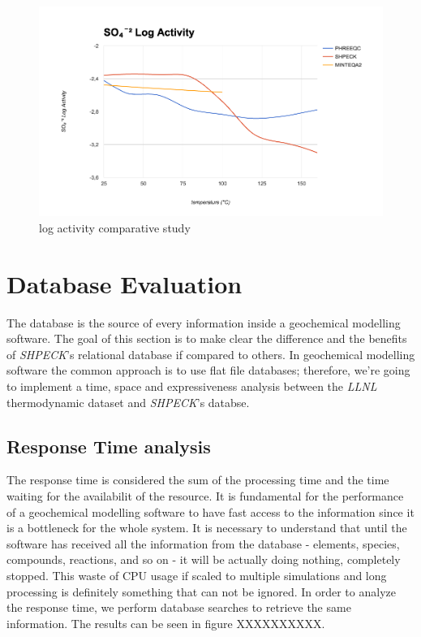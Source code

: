 \begin{figure}[ht!]
\centering
\includegraphics[width=140mm]{figures/so4-2.png}
\caption{ log activity comparative study}
\label{fig:so4-2}
\end{figure}


\newpage
\section{Database Evaluation}
The database is the source of every information inside a geochemical modelling software. The goal of this section is to make clear the difference and the benefits of \emph{SHPECK}'s relational database if compared to others. In geochemical modelling software the common approach is to use flat file databases; therefore, we're going to implement a time, space and expressiveness analysis between the \emph{LLNL} thermodynamic dataset and \emph{SHPECK}'s databse. 


\subsection{Response Time analysis}
The response time is considered the sum of the processing time and the time waiting for the availabilit of the resource. It is fundamental for the performance of a geochemical modelling software to have fast access to the information since it is a bottleneck for the whole system. 
It is necessary to understand that until the software has received all the information from the database - elements, species, compounds, reactions, and so on - it will be actually doing nothing, completely stopped. This waste of CPU usage if scaled to multiple simulations and long processing is definitely something that can not be ignored. 
In order to analyze the response time, we perform database searches to retrieve the same information. The results can be seen in figure XXXXXXXXXX.

